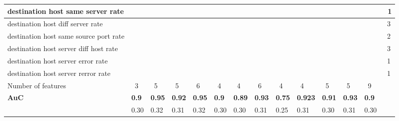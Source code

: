 \documentclass[conference]{IEEEtran}
\begin{document}
\begin{strip}
\begin{multicols}{2}
\begin{flushleft}
\begin{tabular}{l m{3mm} | m{3mm} | m{3mm} | m{3mm} | m{3mm} | m{3mm} | m{3mm} | m{3mm} | m{4mm} | m{3mm} | m{3mm} | m{3mm} | m{3mm} |}
            \multicolumn{1}{|l|}{\tiny destination host same server rate}& & & & & & & & & & & & \cellcolor[gray]{0}& \cellcolor[gray]{0.7} \tiny ~1\\
            \hline
            \multicolumn{1}{|l|}{\tiny destination host diff server rate}& & \cellcolor[gray]{0}& & & & \cellcolor[gray]{0}& & & & & \cellcolor[gray]{0}& & \cellcolor[gray]{0.7} \tiny ~3\\
            \hline
            \multicolumn{1}{|l|}{\tiny destination host same source port rate}& \cellcolor[gray]{0}& & & & & & & & & & \cellcolor[gray]{0}& & \cellcolor[gray]{0.7} \tiny ~2\\
            \hline
            \multicolumn{1}{|l|}{\tiny destination host server diff host rate}& & & & & & & & & \cellcolor[gray]{0}& & \cellcolor[gray]{0}& \cellcolor[gray]{0}& \cellcolor[gray]{0.7} \tiny ~3\\
            \hline
            \multicolumn{1}{|l|}{\tiny destination host server error rate}& & & & \cellcolor[gray]{0}& & & & & & & & & \cellcolor[gray]{0.7} \tiny ~1\\
            \hline
            \multicolumn{1}{|l|}{\tiny destination host server rerror rate}& & & & & & & & \cellcolor[gray]{0}& & & & & \cellcolor[gray]{0.7} \tiny ~1\\
            \hline
            \multicolumn{1}{|l|}{\cellcolor[gray]{0.7}\tiny Number of features}& \cellcolor[gray]{0.7} \tiny ~3& \cellcolor[gray]{0.7} \tiny ~5& \cellcolor[gray]{0.7} \tiny ~5& \cellcolor[gray]{0.7} \tiny ~6& \cellcolor[gray]{0.7} \tiny ~4& \cellcolor[gray]{0.7} \tiny ~4& \cellcolor[gray]{0.7} \tiny ~6& \cellcolor[gray]{0.7} \tiny ~4& \cellcolor[gray]{0.7} \tiny ~4& \cellcolor[gray]{0.7} \tiny ~5& \cellcolor[gray]{0.7} \tiny ~5& \cellcolor[gray]{0.7} \tiny ~9\\
            \cline{1-13}
            \multicolumn{1}{|l|}{\small \textbf{AuC}}& \tiny \textbf{0.9}& \tiny \textbf{0.95}& \tiny \textbf{0.92}& \tiny \textbf{0.95}& \tiny \textbf{0.9}& \tiny \textbf{0.89}& \tiny \textbf{0.93}& \tiny \textbf{0.75}& \tiny \textbf{0.923}& \tiny \textbf{0.91}& \tiny \textbf{0.93}& \tiny \textbf{0.9}\\
            \cline{1-13}
            \multicolumn{1}{l|}{ }& \tiny 0.30& \tiny 0.32& \tiny 0.31& \tiny 0.32& \tiny 0.30& \tiny 0.30& \tiny 0.31& \tiny 0.25& \tiny 0.31& \tiny 0.30& \tiny 0.31& \tiny 0.30\\
            \cline{2-13}
            \end{tabular}\vspace{10px}

\end{flushleft}
\end{multicols}
\end{strip}
\end{document}

